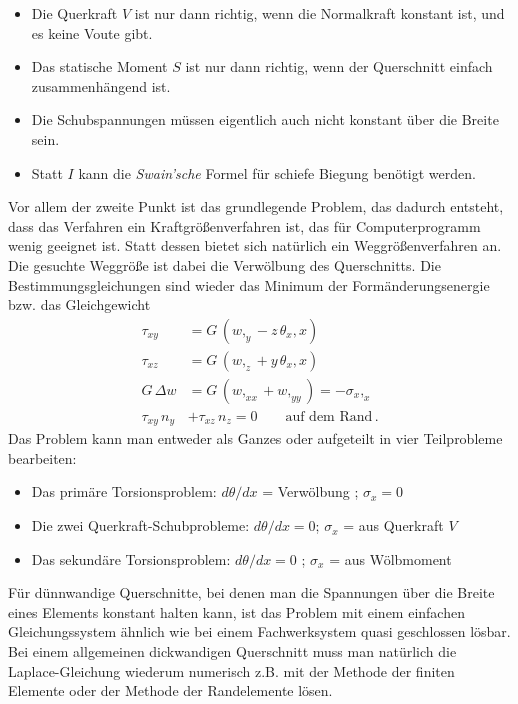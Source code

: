 \begin{itemize}
\item  Die Querkraft $V$ ist nur dann richtig, wenn die Normalkraft konstant ist, und es keine
Voute gibt.
\item  Das statische Moment $S$ ist nur dann richtig, wenn der Querschnitt einfach
zusammenh\"{a}ngend ist.
\item  Die Schubspannungen m\"{u}ssen eigentlich auch nicht konstant \"{u}ber
die Breite sein.
\item  Statt $I$ kann die {\em Swain'sche\/} Formel f\"{u}r schiefe Biegung ben\"{o}tigt
werden.
\end{itemize}
Vor allem der zweite Punkt ist das grundlegende Problem, das dadurch entsteht, dass das Verfahren ein Kraftgr\"{o}{\ss}enverfahren ist, das f\"{u}r Computerprogramm wenig geeignet ist. Statt dessen bietet sich nat\"{u}rlich ein Weggr\"{o}{\ss}enverfahren an. Die gesuchte Weggr\"{o}{\ss}e ist dabei die Verw\"{o}lbung des Querschnitts. Die Bestimmungsgleichungen sind wieder das Minimum der Form\"{a}nderungsenergie bzw. das Gleichgewicht
\begin{subequations}\label{U501}
\begin{align}
\tau_{xy} &= G \,(w,_y - z\,\theta_x,x) \\
\tau_{xz} &= G \,(w,_z + y\,\theta_x,x) \\
G\,\Delta w &= G\,(w,_{xx} + w,_{yy}) = - \sigma_x,_x\\
\tau_{xy}\,n_y &+ \tau_{xz}\,n_z = 0 \qquad \mbox{auf dem Rand}\,.
\end{align}
\end{subequations}
Das Problem kann man entweder als Ganzes oder aufgeteilt in vier Teilprobleme bearbeiten:
\begin{itemize}
\item  Das prim\"{a}re Torsionsproblem:  $d\theta/dx$ = Verw\"{o}lbung ; $\sigma_x = 0$
\item  Die zwei Querkraft-Schubprobleme: $d\theta/dx = 0$; $\sigma_x$ = aus Querkraft $V$
\item  Das sekund\"{a}re Torsionsproblem: $ d\theta/dx = 0$ ; $\sigma_x$ = aus W\"{o}lbmoment
\end{itemize}
F\"{u}r d\"{u}nnwandige Querschnitte, bei denen man die Spannungen \"{u}ber die Breite eines Elements konstant halten kann, ist das Problem mit einem einfachen Gleichungssystem \"{a}hnlich wie bei einem Fachwerksystem quasi geschlossen l\"{o}sbar. Bei einem allgemeinen dickwandigen Querschnitt muss man nat\"{u}rlich die Laplace-Gleichung wiederum numerisch z.B. mit der Methode der finiten Elemente oder der Methode der Randelemente l\"{o}sen.

